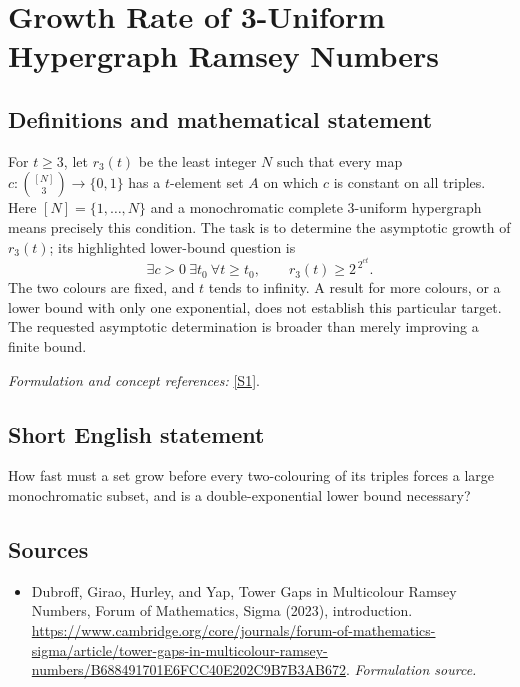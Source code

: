 \documentclass[11pt]{article}
\begin{document}
\section*{\texorpdfstring{Growth Rate of 3-Uniform Hypergraph Ramsey Numbers}{Growth Rate of 3-Uniform Hypergraph Ramsey Numbers}}\label{30006847}
\subsection{Definitions and mathematical statement}
For $t\ge3$, let $r_3(t)$ be the least integer $N$ such that every map $c:\binom{[N]}3\to\{0,1\}$ has a $t$-element set $A$ on which $c$ is constant on all triples. Here $[N]=\{1,\ldots,N\}$ and a monochromatic complete $3$-uniform hypergraph means precisely this condition. The task is to determine the asymptotic growth of $r_3(t)$; its highlighted lower-bound question is
\[
 \exists c>0\ \exists t_0\ \forall t\ge t_0,
 \qquad r_3(t)\ge 2^{\,2^{ct}}.
\]
The two colours are fixed, and $t$ tends to infinity. A result for more colours, or a lower bound with only one exponential, does not establish this particular target. The requested asymptotic determination is broader than merely improving a finite bound.
\par\smallskip\textit{Formulation and concept references:} \href{https://www.cambridge.org/core/journals/forum-of-mathematics-sigma/article/tower-gaps-in-multicolour-ramsey-numbers/B688491701E6FCC40E202C9B7B3AB672}{[S1]}.

\subsection{Short English statement}
How fast must a set grow before every two-colouring of its triples forces a large monochromatic subset, and is a double-exponential lower bound necessary?
\subsection{Sources}
\begin{itemize}
\item[S1]Dubroff, Girao, Hurley, and Yap, Tower Gaps in Multicolour Ramsey Numbers, Forum of Mathematics, Sigma (2023), introduction.
\url{https://www.cambridge.org/core/journals/forum-of-mathematics-sigma/article/tower-gaps-in-multicolour-ramsey-numbers/B688491701E6FCC40E202C9B7B3AB672}.
\textit{Formulation source.}
\end{itemize}
\end{document}
